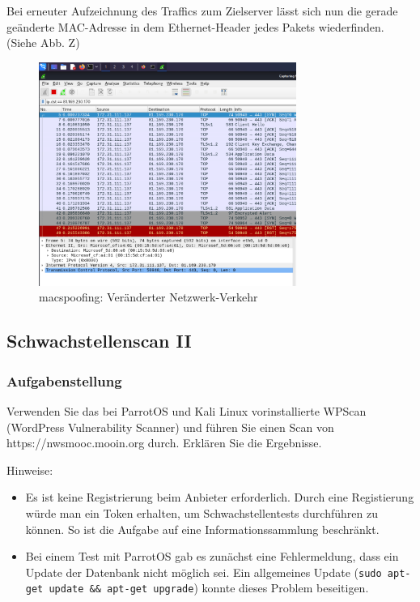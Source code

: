 \documentclass{article}
\begin{document}
Bei erneuter Aufzeichnung des Traffics zum Zielserver lässt sich nun die gerade geänderte 
MAC-Adresse in dem Ethernet-Header jedes Pakets wiederfinden. (Siehe Abb. Z)

\begin{figure}[H]
	\includegraphics[width=0.75\textwidth]{images/11}
	\centering
	\caption{macspoofing: Veränderter Netzwerk-Verkehr}
\end{figure}

\newpage

\subsection{Schwachstellenscan II}

\subsubsection*{Aufgabenstellung}

Verwenden Sie das bei ParrotOS und Kali Linux vorinstallierte WPScan  (WordPress 
Vulnerability Scanner) und führen Sie einen Scan von https://nwsmooc.mooin.org durch. 
Erklären Sie die Ergebnisse.  

\begin{flushleft}
	Hinweise:	
\end{flushleft}


\begin{itemize}
	\item Es ist keine Registrierung beim Anbieter erforderlich. Durch eine Registierung würde man ein Token erhalten, um Schwachstellentests durchführen zu können. So ist die Aufgabe auf eine Informationssammlung beschränkt.
	\item Bei einem Test mit ParrotOS gab es zunächst eine Fehlermeldung, dass ein Update der Datenbank nicht möglich sei. Ein allgemeines Update
		(\texttt{sudo apt-get update \&\& apt-get upgrade}) konnte dieses Problem beseitigen.
\end{itemize}
\end{document}

